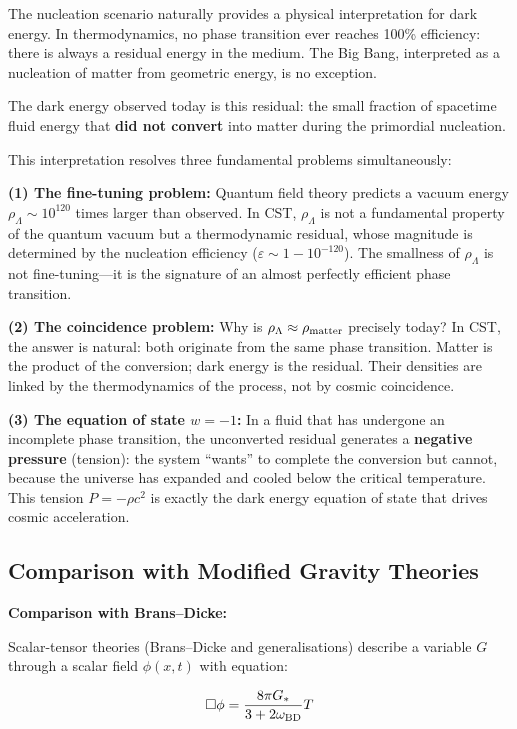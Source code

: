 \documentclass[10pt,a4paper]{article}
\begin{document}
The nucleation scenario naturally provides a physical interpretation for dark energy. In thermodynamics, no phase transition ever reaches 100\% efficiency: there is always a residual energy in the medium. The Big Bang, interpreted as a nucleation of matter from geometric energy, is no exception.

The dark energy observed today is this residual: the small fraction of spacetime fluid energy that \textbf{did not convert} into matter during the primordial nucleation.

This interpretation resolves three fundamental problems simultaneously:

\textbf{(1) The fine-tuning problem:} Quantum field theory predicts a vacuum energy $\rho_\Lambda \sim 10^{120}$ times larger than observed. In CST, $\rho_\Lambda$ is not a fundamental property of the quantum vacuum but a thermodynamic residual, whose magnitude is determined by the nucleation efficiency ($\varepsilon \sim 1 - 10^{-120}$). The smallness of $\rho_\Lambda$ is not fine-tuning---it is the signature of an almost perfectly efficient phase transition.

\textbf{(2) The coincidence problem:} Why is $\rho_\Lambda \approx \rho_{\rm matter}$ precisely today? In CST, the answer is natural: both originate from the same phase transition. Matter is the product of the conversion; dark energy is the residual. Their densities are linked by the thermodynamics of the process, not by cosmic coincidence.

\textbf{(3) The equation of state $w = -1$:} In a fluid that has undergone an incomplete phase transition, the unconverted residual generates a \textbf{negative pressure} (tension): the system ``wants'' to complete the conversion but cannot, because the universe has expanded and cooled below the critical temperature. This tension $P = -\rho c^2$ is exactly the dark energy equation of state that drives cosmic acceleration.

\subsection{Comparison with Modified Gravity
Theories}\label{comparison-with-modified-gravity-theories}

\textbf{Comparison with Brans--Dicke:}

Scalar-tensor theories (Brans--Dicke and generalisations) describe a
variable \(G\) through a scalar field \(\phi(x,t)\) with equation:

\[\square\phi = \frac{8\pi G_*}{3+2\omega_{\rm BD}} T\]
\end{document}
